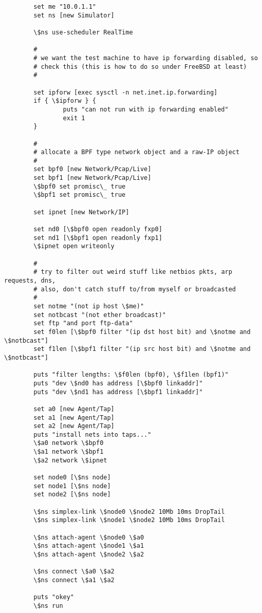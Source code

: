 \begin{verbatim}
        set me "10.0.1.1"
        set ns [new Simulator]

        \$ns use-scheduler RealTime

        #
        # we want the test machine to have ip forwarding disabled, so
        # check this (this is how to do so under FreeBSD at least)
        #

        set ipforw [exec sysctl -n net.inet.ip.forwarding]
        if { \$ipforw } {
                puts "can not run with ip forwarding enabled"
                exit 1
        }

        #
        # allocate a BPF type network object and a raw-IP object
        #
        set bpf0 [new Network/Pcap/Live]
        set bpf1 [new Network/Pcap/Live]
        \$bpf0 set promisc\_ true
        \$bpf1 set promisc\_ true

        set ipnet [new Network/IP]

        set nd0 [\$bpf0 open readonly fxp0]
        set nd1 [\$bpf1 open readonly fxp1]
        \$ipnet open writeonly

        #
        # try to filter out weird stuff like netbios pkts, arp requests, dns,
        # also, don't catch stuff to/from myself or broadcasted
        #
        set notme "(not ip host \$me)"
        set notbcast "(not ether broadcast)"
        set ftp "and port ftp-data"
        set f0len [\$bpf0 filter "(ip dst host bit) and \$notme and \$notbcast"]
        set f1len [\$bpf1 filter "(ip src host bit) and \$notme and \$notbcast"]

        puts "filter lengths: \$f0len (bpf0), \$f1len (bpf1)"
        puts "dev \$nd0 has address [\$bpf0 linkaddr]"
        puts "dev \$nd1 has address [\$bpf1 linkaddr]"

        set a0 [new Agent/Tap]
        set a1 [new Agent/Tap]
        set a2 [new Agent/Tap]
        puts "install nets into taps..."
        \$a0 network \$bpf0
        \$a1 network \$bpf1
        \$a2 network \$ipnet

        set node0 [\$ns node]
        set node1 [\$ns node]
        set node2 [\$ns node]

        \$ns simplex-link \$node0 \$node2 10Mb 10ms DropTail
        \$ns simplex-link \$node1 \$node2 10Mb 10ms DropTail

        \$ns attach-agent \$node0 \$a0
        \$ns attach-agent \$node1 \$a1
        \$ns attach-agent \$node2 \$a2

        \$ns connect \$a0 \$a2
        \$ns connect \$a1 \$a2

        puts "okey"
        \$ns run
\end{verbatim}



